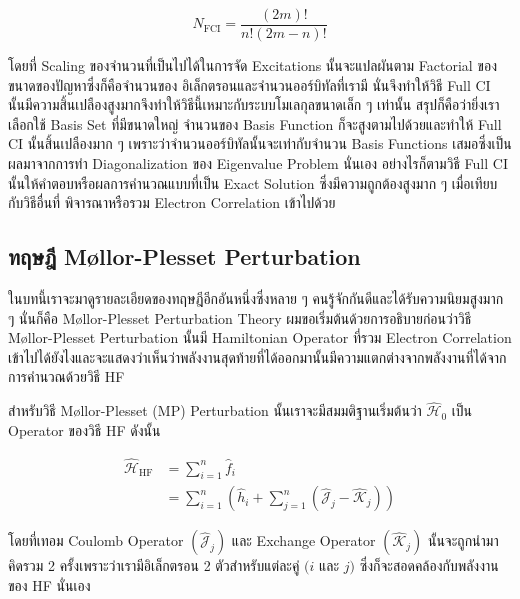 \begin{equation}
    \label{eq:Full_CI}
    N_{\mathrm{FCI}}
    =
    \frac{(2 m) !}{n !(2 m-n) !}
\end{equation}

\noindent โดยที่ Scaling ของจำนวนที่เป็นไปได้ในการจัด Excitations นั้นจะแปลผันตาม Factorial ของขนาดของปัญหาซึ่งก็คือจำนวนของ%
อิเล็กตรอนและจำนวนออร์บิทัลที่เรามี นั่นจึงทำให้วิธี Full CI นั้นมีความสิ้นเปลืองสูงมากจึงทำให้วิธีนี้เหมาะกับระบบโมเลกุลขนาดเล็ก ๆ เท่านั้น
สรุปก็คือว่ายิ่งเราเลือกใช้ Basis Set ที่มีขนาดใหญ่ จำนวนของ Basis Function ก็จะสูงตามไปด้วยและทำให้ Full CI นั้นสิ้นเปลืองมาก ๆ
เพราะว่าจำนวนออร์บิทัลนั้นจะเท่ากับจำนวน Basis Functions เสมอซึ่งเป็นผลมาจากการทำ Diagonalization ของ Eigenvalue Problem
นั่นเอง อย่างไรก็ตามวิธี Full CI นั้นให้คำตอบหรือผลการคำนวณแบบที่เป็น Exact Solution ซึ่งมีความถูกต้องสูงมาก ๆ เมื่อเทียบกับวิธีอื่นที่%
พิจารณาหรือรวม Electron Correlation เข้าไปด้วย

\subsection{ทฤษฎี M\o{}llor-Plesset Perturbation}

ในบทนี้เราจะมาดูรายละเอียดของทฤษฎีอีกอันหนึ่งซึ่งหลาย ๆ คนรู้จักกันดีและได้รับความนิยมสูงมาก ๆ นั่นก็คือ M\o{}llor-Plesset Perturbation
Theory ผมขอเริ่มต้นด้วยการอธิบายก่อนว่าวิธี M\o{}llor-Plesset Perturbation นั้นมี Hamiltonian Operator ที่รวม Electron
Correlation เข้าไปได้ยังไงและจะแสดงว่าเห็นว่าพลังงานสุดท้ายที่ได้ออกมานั้นมีความแตกต่างจากพลังงานที่ได้จากการคำนวณด้วยวิธี HF

สำหรับวิธี M\o{}llor-Plesset (MP) Perturbation นั้นเราจะมีสมมติฐานเริ่มต้นว่า $\hat{\mathscr{H}}_0$ เป็น Operator ของวิธี HF
ดังนั้น

\begin{equation}
    \begin{aligned}
        \hat{\mathscr{H}}_{\mathrm{HF}}
         & = \sum_{i=1}^n \hat{f}_i \\
         & = \sum_{i=1}^n
        \left(
        \hat{h}_i + \sum_{j=1}^n
        \left(
            \hat{\mathscr{J}}_j - \hat{\mathscr{K}}_j
            \right)
        \right)
    \end{aligned}
\end{equation}

\noindent โดยที่เทอม Coulomb Operator $(\hat{\mathcal{J}}_j)$ และ Exchange Operator $(\hat{\mathcal{K}}_j)$
นั้นจะถูกนำมาคิดรวม 2 ครั้งเพราะว่าเรามีอิเล็กตรอน 2 ตัวสำหรับแต่ละคู่ $(i$ และ $j)$ ซึ่งก็จะสอดคล้องกับพลังงานของ HF นั่นเอง

